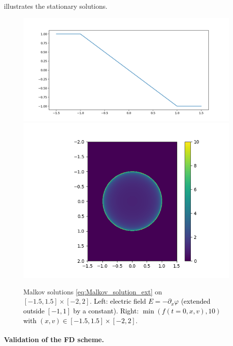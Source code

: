 \documentclass{article}
\numberwithin{equation}{section}
\newcommand{\mysubcaption}[1]{
	\vspace*{5pt}
	\begin{minipage}{0.8\linewidth}
		\begin{center}
			\footnotesize\emph{#1}
		\end{center}
	\end{minipage}
}
\newcommand{\imh}{\textheight} %
\begin{document}
 illustrates the stationary solutions.

\begin{figure}
	\centering
	\renewcommand{\imh}{0.33\linewidth}
	\includegraphics[trim = 50 10 55 30, clip, height=\imh]{images/malkov_solution_Ee}
	\includegraphics[trim = 100 10 60 30, clip, height=\imh]{images/malkov_solution_fe}
	\caption{Malkov solutions \cref{eq:Malkov_solution_ext} on $[-1.5,1.5]\times[-2,2]$. \textcolor{black}{Left: electric field $E=-\partial_x \varphi$ (extended outside $[-1, 1]$ by a constant). Right: $\min(f(t=0, x, v), 10)$ with $(x,v) \in [-1.5,1.5]\times[-2,2]$}.}
	\label{fig:malkov_solutions}
\end{figure}

\paragraph{Validation of the FD scheme. }
\end{document}
